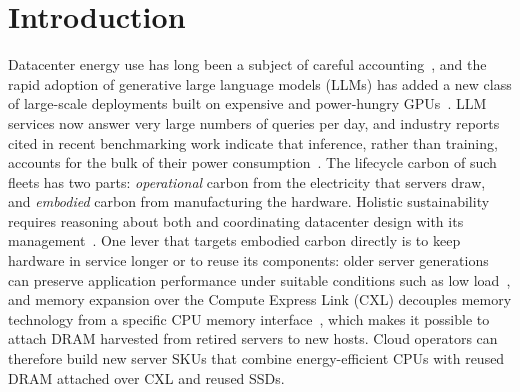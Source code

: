 \documentclass{article} %
\begin{document}
\section{Introduction}
\label{sec:intro}
Datacenter energy use has long been a subject of careful accounting~\citep{Masanet2020RecalibratingGlobal}, and the rapid adoption of generative large language models (LLMs) has added a new class of large-scale deployments built on expensive and power-hungry GPUs~\citep{Patel2023SplitwiseEfficient}. LLM services now answer very large numbers of queries per day, and industry reports cited in recent benchmarking work indicate that inference, rather than training, accounts for the bulk of their power consumption~\citep{Niu2026TokenpowerbenchBenchmarking}. The lifecycle carbon of such fleets has two parts: \emph{operational} carbon from the electricity that servers draw, and \emph{embodied} carbon from manufacturing the hardware. Holistic sustainability requires reasoning about both and coordinating datacenter design with its management~\citep{Acun2023CarbonDependencies}. One lever that targets embodied carbon directly is to keep hardware in service longer or to reuse its components: older server generations can preserve application performance under suitable conditions such as low load~\citep{Wang2023PeelingBack}, and memory expansion over the Compute Express Link (CXL) decouples memory technology from a specific CPU memory interface~\citep{Sun2023DemystifyingCxl,Sharma2024IntroductionCompute}, which makes it possible to attach DRAM harvested from retired servers to new hosts. Cloud operators can therefore build new server SKUs that combine energy-efficient CPUs with reused DRAM attached over CXL and reused SSDs.
\end{document}

